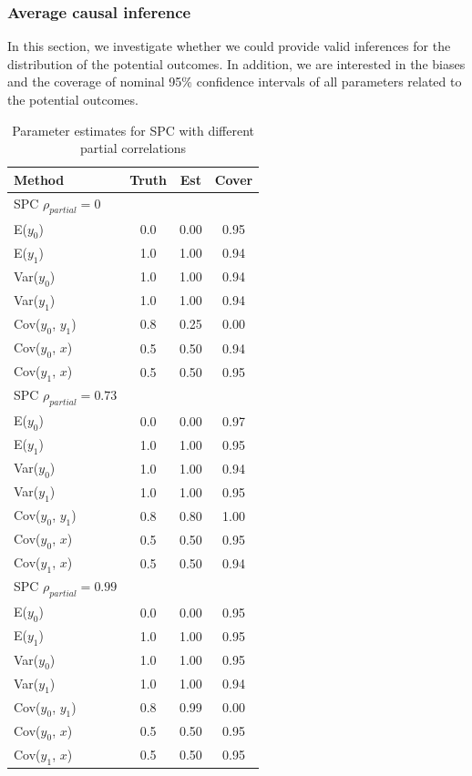 	\subsubsection{Average causal inference}
	In this section, we investigate whether we could provide valid inferences for the distribution of the potential outcomes. In addition, we are interested in the biases and the coverage of nominal 95\% confidence intervals of all parameters related to the potential outcomes.  
	\begin{table}[ht!]
		\centering
		\begin{tabular}{lccc}
			Method & Truth & Est   & Cover \\
			\hline
			SPC $\rho_{partial} = 0$       &      &      &  \\\hline
			E($y_0$)       & 0.0     & 0.00     & 0.95 \\
			E($y_1$)       & 1.0     & 1.00     & 0.94 \\
			Var($y_0$)     & 1.0     & 1.00 & 0.94 \\
			Var($y_1$)     & 1.0     & 1.00 & 0.94 \\
			Cov($y_0$, $y_1$) & 0.8   & 0.25   & 0.00 \\
			Cov($y_0$, $x$)  & 0.5   & 0.50 & 0.94 \\
			Cov($y_1$, $x$)  & 0.5   & 0.50   & 0.95\\\hline
			SPC $\rho_{partial} = 0.73$       &      &      &  \\\hline
			E($y_0$)       & 0.0     & 0.00     & 0.97 \\
			E($y_1$)       & 1.0     & 1.00     & 0.95 \\
			Var($y_0$)     & 1.0     & 1.00 & 0.94 \\
			Var($y_1$)     & 1.0     & 1.00 & 0.95 \\
			Cov($y_0$, $y_1$) & 0.8   & 0.80   & 1.00 \\
			Cov($y_0$, $x$)  & 0.5   & 0.50 & 0.95 \\
			Cov($y_1$, $x$)  & 0.5   & 0.50   & 0.94\\\hline
			SPC $\rho_{partial} = 0.99$       &      &      &  \\\hline
			E($y_0$)       & 0.0     & 0.00     & 0.95 \\
			E($y_1$)       & 1.0     & 1.00     & 0.95 \\
			Var($y_0$)     & 1.0     & 1.00 & 0.95 \\
			Var($y_1$)     & 1.0     & 1.00 & 0.94 \\
			Cov($y_0$, $y_1$) & 0.8   & 0.99   & 0.00 \\
			Cov($y_0$, $x$)  & 0.5   & 0.50 & 0.95 \\
			Cov($y_1$, $x$)  & 0.5   & 0.50   & 0.95
		\end{tabular}
		\caption{Parameter estimates for SPC with different partial correlations}
		\label{tab4_2}
	\end{table} 
